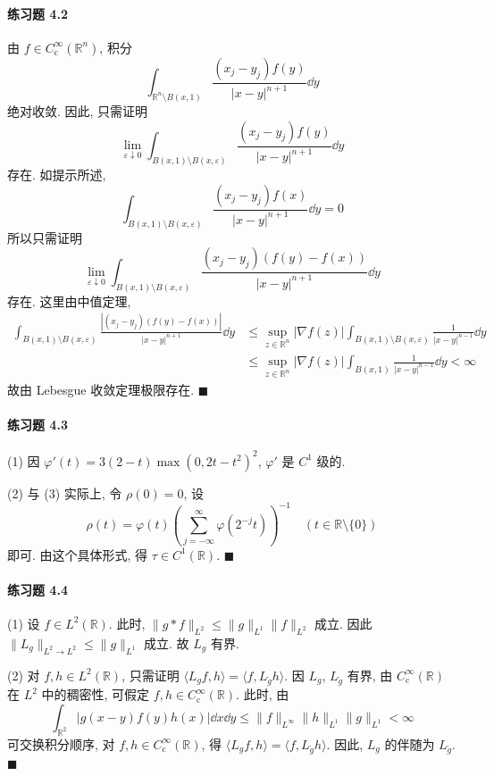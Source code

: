 \paragraph*{练习题 4.2}
由 $f \in C_{\mathrm{c}}^{\infty}(\mathbb{R}^{n})$, 积分
\[
\int_{\mathbb{R}^{n}\setminus B(x,1)}\frac{(x_{j}-y_{j})f(y)}{|x-y|^{n+1}}\dd y
\]
绝对收敛. 因此, 只需证明
\[
\lim_{\varepsilon \downarrow 0}\int_{B(x,1)\setminus B(x,\varepsilon)}\frac{(x_{j}-y_{j})f(y)}{|x-y|^{n+1}}\dd y
\]
存在. 如提示所述,
\[
\int_{B(x,1)\setminus B(x,\varepsilon)}\frac{(x_{j}-y_{j})f(x)}{|x-y|^{n+1}}\dd y = 0
\]
所以只需证明
\[
\lim_{\varepsilon \downarrow 0}\int_{B(x,1)\setminus B(x,\varepsilon)}\frac{(x_{j}-y_{j})(f(y)-f(x))}{|x-y|^{n+1}}\dd y
\]
存在. 这里由中值定理,
\begin{align*}
\int_{B(x,1)\setminus B(x,\varepsilon)}\frac{|(x_{j}-y_{j})(f(y)-f(x))|}{|x-y|^{n+1}}\dd y &\leq \sup_{z \in \mathbb{R}^{n}}|\nabla f(z)|\int_{B(x,1)\setminus B(x,\varepsilon)}\frac{1}{|x-y|^{n-1}}\dd y \\
&\leq \sup_{z \in \mathbb{R}^{n}}|\nabla f(z)|\int_{B(x,1)}\frac{1}{|x-y|^{n-1}}\dd y < \infty
\end{align*}
故由 Lebesgue 收敛定理极限存在. $\blacksquare$

\paragraph*{练习题 4.3}
(1) 因 $\varphi'(t) = 3(2-t)\max(0,2t-t^{2})^{2}$, $\varphi'$ 是 $C^{1}$ 级的.

(2) 与 (3) 实际上, 令 $\rho(0) = 0$, 设
\[
\rho(t) = \varphi(t)\left(\sum_{j=-\infty}^{\infty}\varphi(2^{-j}t)\right)^{-1} \quad (t \in \mathbb{R}\setminus\{0\})
\]
即可. 由这个具体形式, 得 $\tau \in C^{1}(\mathbb{R})$. $\blacksquare$

\paragraph*{练习题 4.4}
(1) 设 $f \in L^{2}(\mathbb{R})$. 此时, $\|g*f\|_{L^{2}} \leq \|g\|_{L^{1}}\|f\|_{L^{2}}$ 成立. 因此 $\|L_{g}\|_{L^{2}\to L^{2}} \leq \|g\|_{L^{1}}$ 成立. 故 $L_{g}$ 有界.

(2) 对 $f, h \in L^{2}(\mathbb{R})$, 只需证明 $\langle L_{g}f, h\rangle = \langle f, L_{\check{g}}h\rangle$. 因 $L_{g}$, $L_{\check{g}}$ 有界, 由 $C_{\mathrm{c}}^{\infty}(\mathbb{R})$ 在 $L^{2}$ 中的稠密性, 可假定 $f, h \in C_{\mathrm{c}}^{\infty}(\mathbb{R})$. 此时, 由
\[
\int_{\mathbb{R}^{2}}|g(x-y)f(y)h(x)|\dd x\dd y \leq \|f\|_{L^{\infty}}\|h\|_{L^{1}}\|g\|_{L^{1}} < \infty
\]
可交换积分顺序, 对 $f, h \in C_{\mathrm{c}}^{\infty}(\mathbb{R})$, 得 $\langle L_{g}f, h\rangle = \langle f, L_{\check{g}}h\rangle$. 因此, $L_{g}$ 的伴随为 $L_{\check{g}}$. $\blacksquare$

